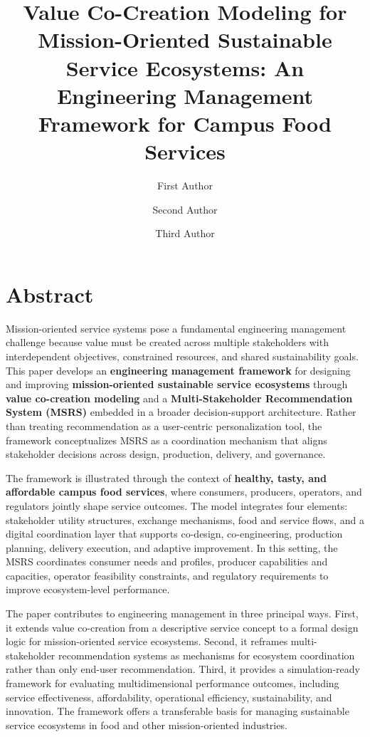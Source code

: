 \documentclass[
  letterpaper,
  DIV=11,
  numbers=noendperiod]{scrartcl}
\title{Value Co-Creation Modeling for Mission-Oriented Sustainable
Service Ecosystems: An Engineering Management Framework for Campus Food
Services}
\author{First Author \and Second Author \and Third Author}
\date{}
\renewcommand*\contentsname{Table of contents}
\newcommand\contentsname{Table of contents}
\begin{document}
\maketitle

\renewcommand*\contentsname{Table of contents}
{
\setcounter{tocdepth}{3}
\tableofcontents
}

\section{Abstract}\label{abstract}

Mission-oriented service systems pose a fundamental engineering
management challenge because value must be created across multiple
stakeholders with interdependent objectives, constrained resources, and
shared sustainability goals. This paper develops an \textbf{engineering
management framework} for designing and improving
\textbf{mission-oriented sustainable service ecosystems} through
\textbf{value co-creation modeling} and a \textbf{Multi-Stakeholder
Recommendation System (MSRS)} embedded in a broader decision-support
architecture. Rather than treating recommendation as a user-centric
personalization tool, the framework conceptualizes MSRS as a
coordination mechanism that aligns stakeholder decisions across design,
production, delivery, and governance.

The framework is illustrated through the context of \textbf{healthy,
tasty, and affordable campus food services}, where consumers, producers,
operators, and regulators jointly shape service outcomes. The model
integrates four elements: stakeholder utility structures, exchange
mechanisms, food and service flows, and a digital coordination layer
that supports co-design, co-engineering, production planning, delivery
execution, and adaptive improvement. In this setting, the MSRS
coordinates consumer needs and profiles, producer capabilities and
capacities, operator feasibility constraints, and regulatory
requirements to improve ecosystem-level performance.

The paper contributes to engineering management in three principal ways.
First, it extends value co-creation from a descriptive service concept
to a formal design logic for mission-oriented service ecosystems.
Second, it reframes multi-stakeholder recommendation systems as
mechanisms for ecosystem coordination rather than only end-user
recommendation. Third, it provides a simulation-ready framework for
evaluating multidimensional performance outcomes, including service
effectiveness, affordability, operational efficiency, sustainability,
and innovation. The framework offers a transferable basis for managing
sustainable service ecosystems in food and other mission-oriented
industries.
\end{document}
